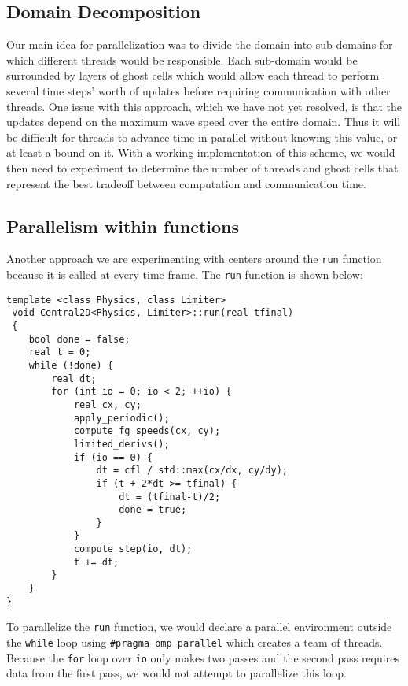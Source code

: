 \documentclass[12pt]{article}
\begin{document}
\subsection{Domain Decomposition}
Our main idea for parallelization was to divide the domain into sub-domains for which different threads would be responsible.
Each sub-domain would be surrounded by layers of ghost cells which would allow each thread to perform several time steps' worth of updates before requiring communication with other threads.
One issue with this approach, which we have not yet resolved, is that the updates depend on the maximum wave speed over the entire domain.
Thus it will be difficult for threads to advance time in parallel without knowing this value, or at least a bound on it.
With a working implementation of this scheme, we would then need to experiment to determine the number of threads and ghost cells that represent the best tradeoff between computation and communication time.

\subsection{Parallelism within functions}

Another approach we are experimenting with centers around the \texttt{run} function because it is called at every time frame.
The \texttt{run} function is shown below:

{
\begin{verbatim}
template <class Physics, class Limiter>
 void Central2D<Physics, Limiter>::run(real tfinal)
 {
    bool done = false;
    real t = 0;
    while (!done) {
        real dt;
        for (int io = 0; io < 2; ++io) {
            real cx, cy;
            apply_periodic();
            compute_fg_speeds(cx, cy);
            limited_derivs();
            if (io == 0) {
                dt = cfl / std::max(cx/dx, cy/dy);
                if (t + 2*dt >= tfinal) {
                    dt = (tfinal-t)/2;
                    done = true;
                }
            }
            compute_step(io, dt);
            t += dt;
        }
    }
}
\end{verbatim} }

To parallelize the \texttt{run} function, we would declare a parallel environment outside the \texttt{while} loop using \texttt{\#pragma omp parallel} which creates a team of threads.
Because the \texttt{for} loop over \texttt{io} only makes two passes and the second pass requires data from the first pass, we would not attempt to parallelize this loop.
\end{document}
